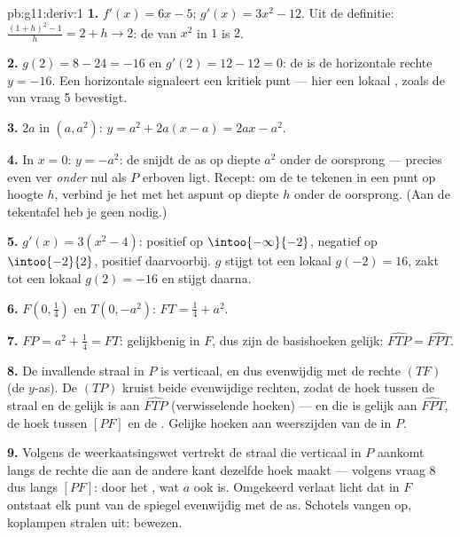 \begin{solution}{pb:g11:deriv:1}
\textbf{1.} $f'(x) = 6x - 5$; $g'(x) = 3x^2 - 12$. Uit de definitie:
$\frac{(1 + h)^2 - 1}{h} = 2 + h \to 2$: de  van $x^2$ in $1$ is
$2$.

\textbf{2.} $g(2) = 8 - 24 = -16$ en $g'(2) = 12 - 12 = 0$: de  is
de horizontale rechte $y = -16$. Een horizontale  signaleert een
kritiek punt --- hier een lokaal , zoals de  van vraag 5
bevestigt.

\textbf{3.}  $2a$ in $(a, a^2)$:
$y = a^2 + 2a(x - a) = 2ax - a^2$.

\textbf{4.} In $x = 0$: $y = -a^2$: de  snijdt de as op diepte $a^2$
onder de oorsprong --- precies even ver \emph{onder} nul als $P$ erboven
ligt. Recept: om de  te tekenen in een punt op hoogte $h$, verbind
je het met het aspunt op diepte $h$ onder de oorsprong. (Aan de tekentafel
heb je geen  nodig.)

\textbf{5.} $g'(x) = 3(x^2 - 4)$: positief op $\intoo{-\infty}{-2}$,
negatief op $\intoo{-2}{2}$, positief daarvoorbij. $g$ stijgt tot een lokaal
 $g(-2) = 16$, zakt tot een lokaal  $g(2) = -16$ en stijgt
daarna.

\textbf{6.} $F\left(0, \frac14\right)$ en $T(0, -a^2)$:
$FT = \frac14 + a^2$.

\textbf{7.} $FP = a^2 + \frac14 = FT$: gelijkbenig in $F$, dus zijn de
basishoeken gelijk: $\widehat{FTP} = \widehat{FPT}$.

\textbf{8.} De invallende straal in $P$ is verticaal, en dus evenwijdig met
de rechte $(TF)$ (de $y$-as). De  $(TP)$ kruist beide evenwijdige
rechten, zodat de hoek tussen de straal en de  gelijk is aan
$\widehat{FTP}$ (verwisselende hoeken) --- en die is gelijk aan
$\widehat{FPT}$, de hoek tussen $[PF]$ en de . Gelijke hoeken aan
weerszijden van de  in $P$.

\textbf{9.} Volgens de weerkaatsingswet vertrekt de straal die verticaal in
$P$ aankomt langs de rechte die aan de andere kant dezelfde hoek maakt ---
volgens vraag 8 dus langs $[PF]$: door het , wat $a$ ook is.
Omgekeerd verlaat licht dat in $F$ ontstaat elk punt van de spiegel
evenwijdig met de as. Schotels vangen op, koplampen stralen uit: bewezen.


\end{solution}
